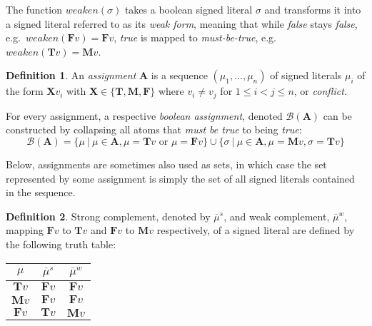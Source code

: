 \documentclass{vutinfth} %
\theoremstyle{example}
\theoremstyle{definition}
\newtheorem{definition}{Definition}[section]
\theoremstyle{theorem}
\theoremstyle{lemma}
\theoremstyle{corollary}
\newtheorem*{remark}{Remark}
\newcommand{\mbt}{must-be-true}
\newcommand{\negstrong}[1]{\overline{#1}^s}
\newcommand{\negweak}[1]{\overline{#1}^w}
\newcommand{\bass}{\mathcal{B}}
\newcommand{\ass}{\mathbf{A}}
\newcommand{\bT}{\mathbf{T}}
\newcommand{\bM}{\mathbf{M}}
\newcommand{\bF}{\mathbf{F}}
\newcommand{\bX}{\mathbf{X}}
\newcommand{\sgl}{\mu}
\newcommand{\bsgl}{\sigma}
\newcommand{\thrice}{{\{\bT, \bM, \bF \}}}
\newcommand{\wkn}{\textit{weaken}}
\begin{document}
The function $\wkn(\bsgl)$ takes a boolean signed literal $\bsgl$ and transforms it into a signed literal referred to as its \emph{weak form}, meaning that while \emph{false} stays \emph{false}, e.g.~$\wkn(\bF v) = \bF v$, \emph{true} is mapped to \emph{\mbt}, e.g.~$\wkn(\bT v) = \bM v$.


\begin{definition}
An \emph{assignment} $\ass$ is a sequence $(\sgl_1, \ldots, \sgl_n)$ of signed literals $\sgl_i$ of the form $\bX v_i$ with $\bX \in \thrice$ where $v_i \not = v_j$ for $1 \leq i < j \leq n$, or \emph{conflict}.

For every assignment, a respective \emph{boolean assignment}, denoted $\bass(\ass)$ can be constructed by collapsing all atoms that \emph{must be true} to being \emph{true}:$$\bass(\ass) = \{ \sgl \ | \ \sgl \in \ass, \sgl = \mathbf{T}v \textrm{ or } \sgl = \mathbf{F}v \} \cup \{ \bsgl \ | \ \sgl \in \ass, \sgl = \mathbf{M}v, \bsgl = \mathbf{T}v \}$$
\end{definition}

Below, assignments are sometimes also used as sets, in which case the set represented by some assignment is simply the set of all signed literals contained in the sequence.

\begin{definition}
Strong complement, denoted by $\negstrong{\sgl}$, and weak complement, $\negweak{\sgl}$, mapping $\mathbf{F}v$ to $\mathbf{T}v$ and $\mathbf{F}v$ to $\mathbf{M}v$ respectively, of a signed literal are defined by the following truth table:%

\begin{center}
\begin{tabular}{|c|cc|}
\hline
$\sgl$&$\negstrong{\sgl}$&$\negweak{\sgl}$\\
\hline
\hline
$\mathbf{T}v$&$\mathbf{F}v$&$\mathbf{F}v$\\
$\mathbf{M}v$&$\mathbf{F}v$&$\mathbf{F}v$\\
$\mathbf{F}v$&$\mathbf{T}v$&$\mathbf{M}v$\\
\hline
\end{tabular}
\end{center}
\end{definition}
\end{document}
